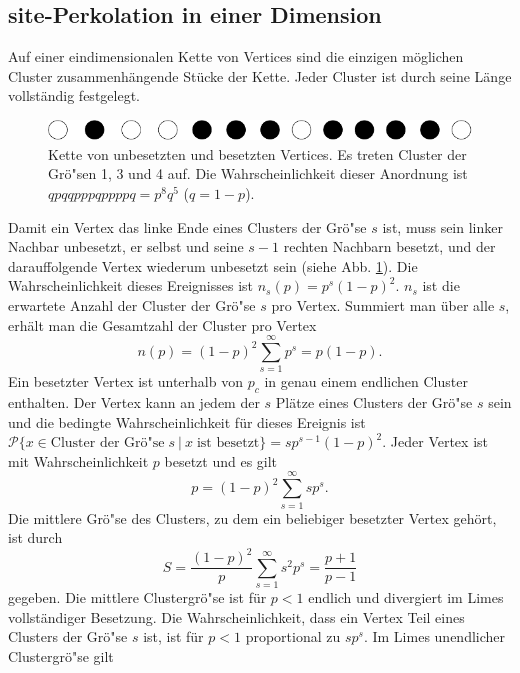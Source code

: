 \subsection{site-Perkolation in einer Dimension}
Auf einer eindimensionalen Kette von Vertices sind die einzigen m\"oglichen Cluster zusammenh\"angende St\"ucke der Kette. Jeder Cluster ist durch seine L\"ange vollst\"andig festgelegt. 
\begin{figure}[bp]
  \centering
  \includegraphics{./Einleitung-figs/1d_simple}
  \caption{Kette von unbesetzten und besetzten Vertices. Es treten Cluster der Gr\"o"sen 1, 3 und 4 auf. Die Wahrscheinlichkeit dieser Anordnung ist $qpqqpppqppppq=p^8q^5$ ($q=1-p$). }
  \label{fig:1d_simple}
\end{figure}
Damit ein Vertex das linke Ende eines Clusters der Gr\"o"se $s$ ist, muss sein linker Nachbar unbesetzt, er selbst und seine $s-1$ rechten Nachbarn besetzt, und der darauffolgende Vertex wiederum unbesetzt sein (siehe Abb. \ref{fig:1d_simple}). Die Wahrscheinlichkeit dieses Ereignisses ist $n_s(p)=p^s(1-p)^2$. $n_s$ ist die erwartete Anzahl der Cluster der Gr\"o"se $s$ pro Vertex. Summiert man \"uber alle $s$, erh\"alt man die Gesamtzahl der Cluster pro Vertex
\begin{equation}
  n(p)=(1-p)^2\sum_{s=1}^\infty p^s=p(1-p).
\end{equation}
Ein besetzter Vertex ist unterhalb von $p_c$ in genau einem endlichen Cluster enthalten. Der Vertex kann an jedem der $s$ Pl\"atze eines Clusters der Gr\"o"se $s$ sein und die bedingte Wahrscheinlichkeit f\"ur dieses Ereignis ist $\mathcal{P}\{ x\in \text{Cluster der Gr\"o"se} \; s\:|\: x \; \text{ist besetzt}\}=sp^{s-1}(1-p)^2$. Jeder Vertex ist mit Wahrscheinlichkeit $p$ besetzt und es gilt\begin{equation}
  p=(1-p)^2\sum_{s=1}^\infty sp^s.
\end{equation}
Die mittlere Gr\"o"se des Clusters, zu dem ein beliebiger besetzter Vertex geh\"ort, ist durch
\begin{equation}
  S=\frac{(1-p)^2}{p}\sum_{s=1}^\infty s^2p^s=\frac{p+1}{p-1}
\end{equation}
gegeben. Die mittlere Clustergr\"o"se ist f\"ur $p<1$ endlich und divergiert im Limes vollst\"andiger Besetzung. Die Wahrscheinlichkeit, dass ein Vertex Teil eines Clusters der Gr\"o"se $s$ ist, ist f\"ur $p<1$ proportional zu $sp^s$. Im Limes unendlicher Clustergr\"o"se gilt
